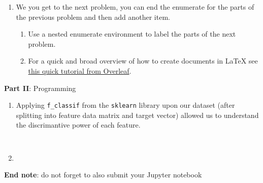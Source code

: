 \documentclass[12pt]{article}
\begin{document}
\begin{enumerate}[leftmargin=\labelsep]
    \item We you get to the next problem, you can end the enumerate for the parts of the previous problem and then add another item.
          \begin{enumerate}
              \item Use a nested enumerate environment to label the parts of the next problem.
              \item For a quick and broad overview of how to create documents in {\LaTeX} see
                    \href{https://www.overleaf.com/learn/latex/Learn_LaTeX_in_30_minutes}{this quick tutorial from Overleaf}.
          \end{enumerate}
\end{enumerate}

\large{\textbf{Part II}: Programming}\normalsize

\begin{enumerate}[leftmargin=\labelsep]
    \item Applying \texttt{f\_classif} from the \texttt{sklearn} library upon our dataset (after splitting into feature data matrix and target vector) allowed us to understand the discrimantive power of each feature. \\
    \begin{lstlisting}
        
    \end{lstlisting}

    \item
\end{enumerate}

\vskip 1cm
\textbf{End note}: do not forget to also submit your Jupyter notebook
\end{document}
